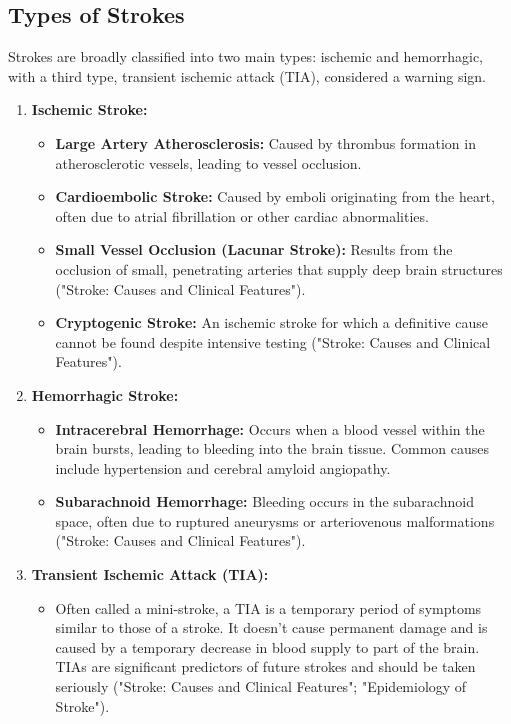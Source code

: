 \subsection{Types of Strokes}
\label{sec:typesofstrokes}
Strokes are broadly classified into two main types: ischemic and hemorrhagic, with a third type, transient ischemic attack (TIA), considered a warning sign.
\begin{enumerate}
  \item \textbf{Ischemic Stroke:}
  \begin{itemize}
    \item \textbf{Large Artery Atherosclerosis:} Caused by thrombus formation in atherosclerotic vessels, leading to vessel occlusion.
    \item \textbf{Cardioembolic Stroke:} Caused by emboli originating from the heart, often due to atrial fibrillation or other cardiac abnormalities.
    \item \textbf{Small Vessel Occlusion (Lacunar Stroke):} Results from the occlusion of small, penetrating arteries that supply deep brain structures ("Stroke: Causes and Clinical Features").
    \item \textbf{Cryptogenic Stroke:} An ischemic stroke for which a definitive cause cannot be found despite intensive testing ("Stroke: Causes and Clinical Features"). 
  \end{itemize}
  \item \textbf{Hemorrhagic Stroke:}
  \begin{itemize}
    \item \textbf{Intracerebral Hemorrhage: } Occurs when a blood vessel within the brain bursts, leading to bleeding into the brain tissue. Common causes include hypertension and cerebral amyloid angiopathy.
    \item \textbf{Subarachnoid Hemorrhage: } Bleeding occurs in the subarachnoid space, often due to ruptured aneurysms or arteriovenous malformations ("Stroke: Causes and Clinical Features").
  \end{itemize}
  \item \textbf{Transient Ischemic Attack (TIA):}
  \begin{itemize}
    \item Often called a mini-stroke, a TIA is a temporary period of symptoms similar to those of a stroke. It doesn’t cause permanent damage and is caused by a temporary decrease in blood supply to part of the brain. TIAs are significant predictors of future strokes and should be taken seriously ("Stroke: Causes and Clinical Features"; "Epidemiology of Stroke").
  \end{itemize}
\end{enumerate}

